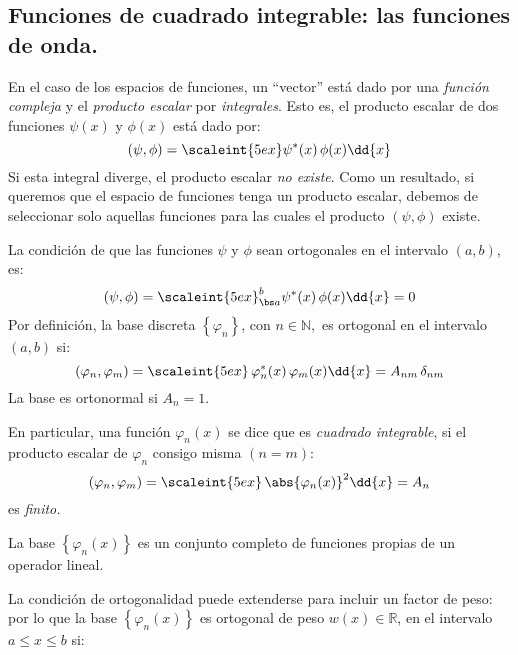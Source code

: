 \subsection{Funciones de cuadrado integrable: las funciones de onda.}

En el caso de los espacios de funciones, un \enquote{vector} está dado por una \emph{función compleja} y el \emph{producto escalar} por \emph{integrales}. Esto es, el producto escalar de dos funciones $\psi (x)$ y $\phi (x)$ está dado por:
\begin{equation}
(\psi, \phi) = \scaleint{5ex} \psi^{*} (x) \, \phi (x) \dd{x}
\label{eq:ecuacion_02_21}
\end{equation}
Si esta integral diverge, el producto escalar \emph{no existe}. Como un resultado, si queremos que el espacio de funciones tenga un producto escalar, debemos de seleccionar solo aquellas funciones para las cuales el producto $(\psi, \phi)$ existe.
\par
La condición de que las funciones $\psi$ y $\phi$ sean ortogonales en el intervalo $(a, b)$, es:
\begin{align*}
(\psi, \phi) = \scaleint{5ex}_{\bs a}^{b} \psi^{*} (x) \, \phi (x) \dd{x} = 0
\end{align*}
Por definición, la base discreta $\left\{ \varphi_{n} \right\}$, con $n \in \mathbb{N},$ es ortogonal en el intervalo $(a, b)$ si:
\begin{equation}
(\varphi_{n}, \varphi_{m}) = \scaleint{5ex} \, \varphi_{n}^{*} (x) \, \varphi_{m} (x) \dd{x} = A_{nm} \, \delta_{nm}
\label{eq:ecuacion_05_02}
\end{equation}
La base es ortonormal si  $A_{n} = 1$.
\par
En particular, una función $\varphi_{n} (x)$ se dice que es \emph{cuadrado integrable}, si el producto escalar de $\varphi_{n}$ consigo misma $(n = m)$:
\begin{equation}
(\varphi_{n}, \varphi_{m}) = \scaleint{5ex} \, \abs{\varphi_{n} (x)}^{2} \dd{x} =  A_{n}
\label{eq:ecuacion_02_22}
\end{equation}
es \emph{finito.}
\par
La base $\left\{ \varphi_{n} (x) \right\}$ es un conjunto completo de funciones propias de un operador lineal.
\par
La condición de ortogonalidad puede extenderse para incluir un factor de peso: por lo que la base $\left\{ \varphi_{n} (x) \right\}$ es ortogonal de peso $w(x) \in \mathbb{R}$, en el intervalo $a \leq x \leq b$ si:
